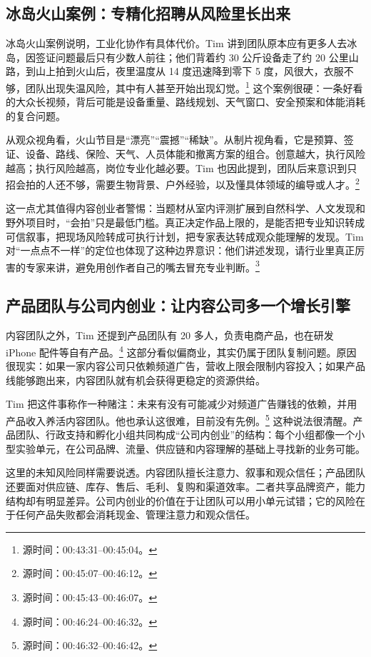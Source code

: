 \documentclass[a4paper]{article}
\begin{document}
\subsection{冰岛火山案例：专精化招聘从风险里长出来}

冰岛火山案例说明，工业化协作有具体代价。Tim 讲到团队原本应有更多人去冰岛，因签证问题最后只有少数人前往；他们背着约 30 公斤设备走了约 20 公里山路，到山上拍到火山后，夜里温度从 14 度迅速降到零下 5 度，风很大，衣服不够，团队出现失温风险，其中有人甚至开始出现幻觉。\footnote{源时间：00:43:31--00:45:04。} 这个案例很硬：一条好看的大众长视频，背后可能是设备重量、路线规划、天气窗口、安全预案和体能消耗的复合问题。

从观众视角看，火山节目是“漂亮”“震撼”“稀缺”。从制片视角看，它是预算、签证、设备、路线、保险、天气、人员体能和撤离方案的组合。创意越大，执行风险越高；执行风险越高，岗位专业化越必要。Tim 也因此提到，团队后来意识到只招会拍的人还不够，需要生物背景、户外经验，以及懂具体领域的编导或人才。\footnote{源时间：00:45:07--00:46:12。}

这一点尤其值得内容创业者警惕：当题材从室内评测扩展到自然科学、人文发现和野外项目时，“会拍”只是最低门槛。真正决定作品上限的，是能否把专业知识转成可信叙事，把现场风险转成可执行计划，把专家表达转成观众能理解的发现。Tim 对“一点点不一样”的定位也体现了这种边界意识：他们讲述发现，请行业里真正厉害的专家来讲，避免用创作者自己的嘴去冒充专业判断。\footnote{源时间：00:45:43--00:46:07。}

\subsection{产品团队与公司内创业：让内容公司多一个增长引擎}

内容团队之外，Tim 还提到产品团队有 20 多人，负责电商产品，也在研发 iPhone 配件等自有产品。\footnote{源时间：00:46:24--00:46:32。} 这部分看似偏商业，其实仍属于团队复制问题。原因很现实：如果一家内容公司只依赖频道广告，营收上限会限制内容投入；如果产品线能够跑出来，内容团队就有机会获得更稳定的资源供给。

Tim 把这件事称作一种赌注：未来有没有可能减少对频道广告赚钱的依赖，并用产品收入养活内容团队。他也承认这很难，目前没有先例。\footnote{源时间：00:46:32--00:46:42。} 这种说法很清醒。产品团队、行政支持和孵化小组共同构成“公司内创业”的结构：每个小组都像一个小型实验单元，在公司品牌、流量、供应链和内容理解的基础上寻找新的业务可能。

这里的未知风险同样需要说透。内容团队擅长注意力、叙事和观众信任；产品团队还要面对供应链、库存、售后、毛利、复购和渠道效率。二者共享品牌资产，能力结构却有明显差异。公司内创业的价值在于让团队可以用小单元试错；它的风险在于任何产品失败都会消耗现金、管理注意力和观众信任。
\end{document}
